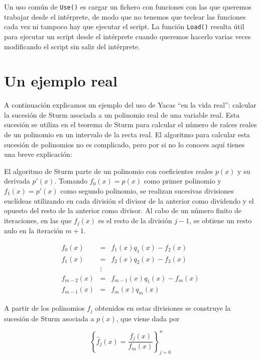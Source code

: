 Un uso  común de \verb+Use()+ es  cargar un fichero con  funciones con
las que queremos trabajar desde el  intérprete, de modo que no tenemos
que teclear  las funciones  cada vez  ni tampoco  hay que  ejecutar el
script. La función \verb+Load()+ resulta  útil para ejecutar un script
desde el  intérprete cuando queremos hacerlo  varias veces modificando
el script sin salir del intérprete.



\section{Un ejemplo real}


A continuación  explicamos un ejemplo  del uso  de Yacas ``en  la vida
real'': calcular la sucesión de Sturm  asociada a un polinomio real de
una variable  real. Esta sucesión  se utiliza  en el teorema  de Sturm
para  calcular el  número  de  raíces reales  de  un  polinomio en  un
intervalo de la  recta real. El algoritmo para  calcular esta sucesión
de polinomios no es complicado, pero  por si no lo conoces aquí tienes
una breve explicación:

El algoritmo  de Sturm parte  de un polinomio con  coeficientes reales
$p(x)$  y su  derivada $p'(x)$.  Tomando $f_0(x)  = p(x)$  como primer
polinomio  y $f_1(x)  =  p'(x)$ como  segundo  polinomio, se  realizan
sucesivas divisiones euclídeas utilizando  en cada división el divisor
de la  anterior como dividendo y  el opuesto del resto  de la anterior
como divisor. Al  cabo de un número finito de  iteraciones, en las que
$f_j(x)$ es el resto de la división $j-1$, se obtiene un resto nulo en
la iteración $m+1$.

\begin{eqnarray*}
f_0(x) & = & f_1(x) q_1(x) - f_2(x)          \\
f_1(x) & = & f_2(x) q_2(x) - f_3(x)          \\
& \vdots &                                   \\
f_{m-2}(x) & = & f_{m-1}(x) q_1(x) - f_m(x)  \\
f_{m-1}(x) & = & f_m(x) q_m(x)
\end{eqnarray*}

A  partir de  los polinomios  $f_j$ obtenidos  en estas  divisiones se
construye la sucesión de Sturm asociada a $p(x)$, que viene dada por

$$\left\{\hat{f}_j(x) = \frac{f_j(x)}{f_m(x)}\right\}_{j=0}^{n}$$


